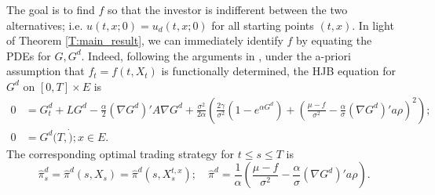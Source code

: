 \documentclass[11pt, letterpaper]{amsart}
\theoremstyle{definition}
\theoremstyle{remark}
\numberwithin{equation}{section}
\newcommand{\hpi}{\hat{\pi}}
\begin{document}
The goal is to find $f$ so that the investor is indifferent between the two alternatives; i.e. $u(t,x;0) = u_d(t,x;0)$ for all starting points $(t,x)$.  In light of Theorem \ref{T:main_result}, we can immediately identify $f$ by equating the PDEs for $G,G^d$.  Indeed, following the arguments in \cite[Proposition 2.1]{MR2359373}, under the a-priori assumption that $f_t = f(t,X_t)$ is functionally determined, the HJB equation for $G^d$ on $[0,T]\times E$ is
\begin{equation}\label{E:G_d_PDE}
\begin{split}
0 & = G^d_t + LG^d - \frac{\alpha}{2}(\nabla G^d)'A\nabla G^d + \frac{\sigma^2}{2\alpha}\left(\frac{2\gamma}{\sigma^2}\left(1-e^{\alpha G^d}\right) + \left(\frac{\mu-f}{\sigma^2} - \frac{\alpha}{\sigma}(\nabla G^d)'a\rho\right)^2\right);\\
0 &= G^d(T,\dot); x\in E.
\end{split}
\end{equation}
The corresponding optimal trading strategy for $t\leq s\leq T$ is
\begin{equation}\label{E:opt_pi_d}
\hpi^d_s  = \hpi^d(s,X_s) = \hpi^d(s,X^{t,x}_s);\quad \hpi^d = \frac{1}{\alpha}\left(\frac{\mu-f}{\sigma^2} - \frac{\alpha}{\sigma}(\nabla G^d)'a\rho\right).
\end{equation}
\end{document}
